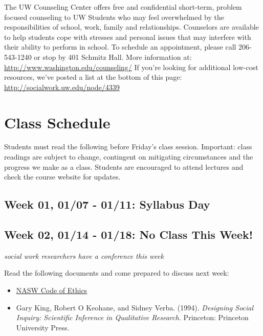 \documentclass[11pt,]{article}
\providecommand{\tightlist}{%
  \setlength{\itemsep}{0pt}\setlength{\parskip}{0pt}}
\begin{document}
The UW Counseling Center offers free and confidential short-term,
problem focused counseling to UW Students who may feel overwhelmed by
the responsibilities of school, work, family and relationships.
Counselors are available to help students cope with stresses and
personal issues that may interfere with their ability to perform in
school. To schedule an appointment, please call 206-543-1240 or stop by
401 Schmitz Hall. More information at:
\url{http://www.washington.edu/counseling/} If you're looking for
additional low-cost resources, we've posted a list at the bottom of this
page: \url{http://socialwork.uw.edu/node/4339}

\newpage

\section{Class Schedule}\label{class-schedule}

Students must read the following before Friday's class session.
Important: class readings are subject to change, contingent on
mitigating circumstances and the progress we make as a class. Students
are encouraged to attend lectures and check the course website for
updates.

\subsection{Week 01, 01/07 - 01/11: Syllabus
Day}\label{week-01-0107---0111-syllabus-day}

\subsection{Week 02, 01/14 - 01/18: No Class This
Week!}\label{week-02-0114---0118-no-class-this-week}

\emph{social work researchers have a conference this week}

Read the following documents and come prepared to discuss next week:

\begin{itemize}
\tightlist
\item
  \href{https://www.socialworkers.org/About/Ethics/Code-of-Ethics/Code-of-Ethics-English}{NASW
  Code of Ethics}
\item
  Gary King, Robert O Keohane, and Sidney Verba. (1994). \emph{Designing
  Social Inquiry: Scientific Inference in Qualitative Research.}
  Princeton: Princeton University Press.
\end{itemize}
\end{document}
